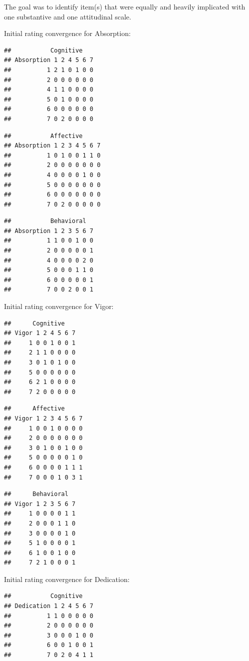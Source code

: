 \documentclass[
]{book}
\begin{document}
The goal was to identify item(s) that were equally and heavily implicated with one substantive and one attitudinal scale.

Initial rating convergence for Absorption:

\begin{verbatim}
##           Cognitive
## Absorption 1 2 4 5 6 7
##          1 2 1 0 1 0 0
##          2 0 0 0 0 0 0
##          4 1 1 0 0 0 0
##          5 0 1 0 0 0 0
##          6 0 0 0 0 0 0
##          7 0 2 0 0 0 0
\end{verbatim}

\begin{verbatim}
##           Affective
## Absorption 1 2 3 4 5 6 7
##          1 0 1 0 0 1 1 0
##          2 0 0 0 0 0 0 0
##          4 0 0 0 0 1 0 0
##          5 0 0 0 0 0 0 0
##          6 0 0 0 0 0 0 0
##          7 0 2 0 0 0 0 0
\end{verbatim}

\begin{verbatim}
##           Behavioral
## Absorption 1 2 3 5 6 7
##          1 1 0 0 1 0 0
##          2 0 0 0 0 0 1
##          4 0 0 0 0 2 0
##          5 0 0 0 1 1 0
##          6 0 0 0 0 0 1
##          7 0 0 2 0 0 1
\end{verbatim}

Initial rating convergence for Vigor:

\begin{verbatim}
##      Cognitive
## Vigor 1 2 4 5 6 7
##     1 0 0 1 0 0 1
##     2 1 1 0 0 0 0
##     3 0 1 0 1 0 0
##     5 0 0 0 0 0 0
##     6 2 1 0 0 0 0
##     7 2 0 0 0 0 0
\end{verbatim}

\begin{verbatim}
##      Affective
## Vigor 1 2 3 4 5 6 7
##     1 0 0 1 0 0 0 0
##     2 0 0 0 0 0 0 0
##     3 0 1 0 0 1 0 0
##     5 0 0 0 0 0 1 0
##     6 0 0 0 0 1 1 1
##     7 0 0 0 1 0 3 1
\end{verbatim}

\begin{verbatim}
##      Behavioral
## Vigor 1 2 3 5 6 7
##     1 0 0 0 0 1 1
##     2 0 0 0 1 1 0
##     3 0 0 0 0 1 0
##     5 1 0 0 0 0 1
##     6 1 0 0 1 0 0
##     7 2 1 0 0 0 1
\end{verbatim}

Initial rating convergence for Dedication:

\begin{verbatim}
##           Cognitive
## Dedication 1 2 4 5 6 7
##          1 1 0 0 0 0 0
##          2 0 0 0 0 0 0
##          3 0 0 0 1 0 0
##          6 0 0 1 0 0 1
##          7 0 2 0 4 1 1
\end{verbatim}
\end{document}
